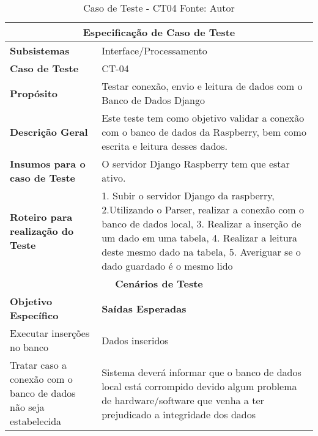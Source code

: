 \begin{table}[H]
    \begin{center}
        \begin{tabular}{|p{5cm}|p{12cm}|}
            \hline
            \multicolumn{2}{|c|}{\textbf{Especificação de Caso de Teste}} \\ \hline
                \textbf{Subsistemas}                               & Interface/Processamento\\ \hline
                \textbf{Caso de Teste}                             & CT-04 \\ \hline
                \textbf{Propósito}                                     & Testar conexão, envio e leitura de dados com o Banco de Dados Django \\ \hline
                \textbf{Descrição Geral}                           & Este teste tem como objetivo validar a conexão com o banco de dados da Raspberry, bem como escrita e leitura desses dados. \\ \hline
                \textbf{Insumos para o caso de Teste}    & O servidor Django Raspberry tem que estar ativo. \\ \hline
                \textbf{Roteiro para realização do Teste}&  1. Subir o servidor Django da raspberry, 2.Utilizando o Parser, realizar a conexão com o banco de dados local, 3. Realizar a inserção de um dado em uma tabela, 4. Realizar a leitura deste mesmo dado na tabela, 5. Averiguar se o dado guardado é o mesmo lido  \\ \hline
            \multicolumn{2}{|c|}{\textbf{Cenários de Teste}} \\ \hline
                \textbf{Objetivo Específico}                      & \textbf{Saídas Esperadas} \\ \hline
               Executar inserções no banco			& Dados inseridos \\ \hline
               Tratar caso a conexão com o banco de dados não seja estabelecida & Sistema deverá informar que o banco de dados local está corrompido devido algum problema de hardware/software que venha a ter prejudicado a integridade dos dados \\ \hline
        \end{tabular}
    \end{center}
    \caption[Caso de Teste - CT04]{Caso de Teste - CT04
    \protect Fonte: Autor}
    \label{CT-04}
\end{table}

